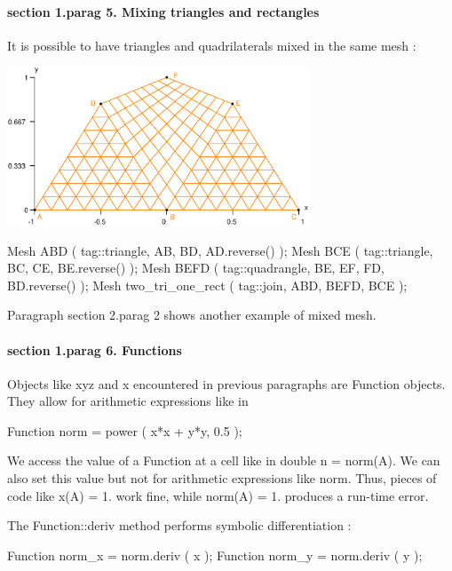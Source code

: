 \paragraph{\numb section 1.\numb parag 5. Mixing triangles and rectangles}

It is possible to have triangles and quadrilaterals mixed in the same mesh :

{ 
\centerline{\includegraphics[width=9cm]{two-tri-one-rect.eps}} }

\verbatim
   Mesh ABD ( tag::triangle, AB, BD, AD.reverse() );
   Mesh BCE ( tag::triangle, BC, CE, BE.reverse() );
   Mesh BEFD ( tag::quadrangle, BE, EF, FD, BD.reverse() );
   Mesh two_tri_one_rect ( tag::join, ABD, BEFD, BCE );
\endverbatim

Paragraph \numb section 2.\numb parag 2 shows another example of mixed mesh.


\paragraph{\numb section 1.\numb parag 6. Functions}

Objects like {\codett xyz} and {\codett x} encountered in previous paragraphs
are {\codett Function} objects.
They allow for arithmetic expressions like in

\verbatim
   Function norm = power ( x*x + y*y, 0.5 );
\endverbatim

We access the value of a {\codett Function} at a cell like in {\codett double n = norm(A)}.
We can also set this value but not for arithmetic expressions like {\codett norm}.
Thus, pieces of code like {\codett x(A) = 1.} work fine, while {\codett norm(A) = 1.}
produces a run-time error.

The {\codett Function::deriv} method performs symbolic differentiation :

\verbatim
   Function norm_x = norm.deriv ( x );
   Function norm_y = norm.deriv ( y );
\endverbatim


